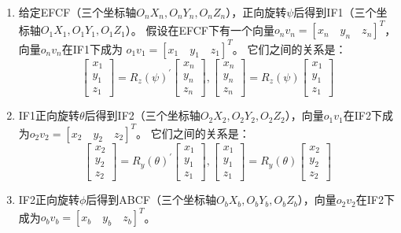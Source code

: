 \documentclass{article} %
\numberwithin{equation}{section} %
\begin{document}
\begin{enumerate}
\item 给定EFCF（三个坐标轴$O_nX_n,O_nY_n,O_nZ_n$），正向旋转$\psi$后得到IF1（三个坐标轴$O_1X_1,O_1Y_1,O_1Z_1$）。
假设在EFCF下有一个向量$o_nv_n=[x_n\quad y_n\quad z_n]^T$，向量$o_nv_n$在IF1下成为 $o_1v_1=[x_1\quad y_1\quad z_1]^T$。
它们之间的关系是：
\begin{equation}
\begin{bmatrix}x_1\\y_1\\z_1\end{bmatrix} = R_z(\psi)^{'}\begin{bmatrix}x_n\\y_n\\z_n\end{bmatrix},
\begin{bmatrix}x_n\\y_n\\z_n\end{bmatrix} = R_z(\psi)\begin{bmatrix}x_1\\y_1\\z_1\end{bmatrix}
\end{equation}
\item IF1正向旋转$\theta$后得到IF2（三个坐标轴$O_2X_2,O_2Y_2,O_2Z_2$），向量$o_1v_1$在IF2下成为$o_2v_2=[x_2\quad y_2\quad z_2]^T$。
它们之间的关系是：
\begin{equation}
\begin{bmatrix}x_2\\y_2\\z_2\end{bmatrix} = R_y(\theta)^{'}\begin{bmatrix}x_1\\y_1\\z_1\end{bmatrix},
\begin{bmatrix}x_1\\y_1\\z_1\end{bmatrix} = R_y(\theta)\begin{bmatrix}x_2\\y_2\\z_2\end{bmatrix}
\end{equation}
\item IF2正向旋转$\phi$后得到ABCF（三个坐标轴$O_bX_b,O_bY_b,O_bZ_b$），向量$o_2v_2$在IF2下成为$o_bv_b=[x_b\quad y_b\quad z_b]^T$。

\end{enumerate}
\end{document}
